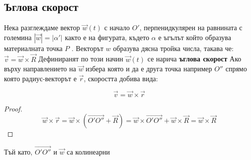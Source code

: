 \documentclass{report}
\begin{document}
\subsection{Ъглова скорост}

Нека разглеждаме вектор $\vec{w}(t)$ с начало $O'$, перпенидкулярен на равнината с големина $|\vec{w}|=|\alpha'|$ както е на фигурата, където $\alpha$ е ъгълът който образува материалната точка $P$ .
Векторът $w$ образува дясна тройка числа, такава че: $\vec v = \vec w \times \vec R$
Дефиниранят по този начин $\vec w(t)$ се нарича \textbf{ъглова скорост}
Ако върху направлението на $\vec w $ избера която и да е друга точка например $O''$ спрямо която радиус-векторът е $\vec r$, скоростта добива вида:

$$\vec v= \vec w \times \vec r$$
\begin{proof}
	$$\vec w \times \vec r = \vec w \times (\vec{O'O''}+\vec R) = \vec w \times \vec{O'O''} + \vec w \times \vec R = \vec w \times \vec R$$

	
\end{proof}
Тъй като, $\vec{O'O''}$ и $\vec w$ са колинеарни
\end{document}
